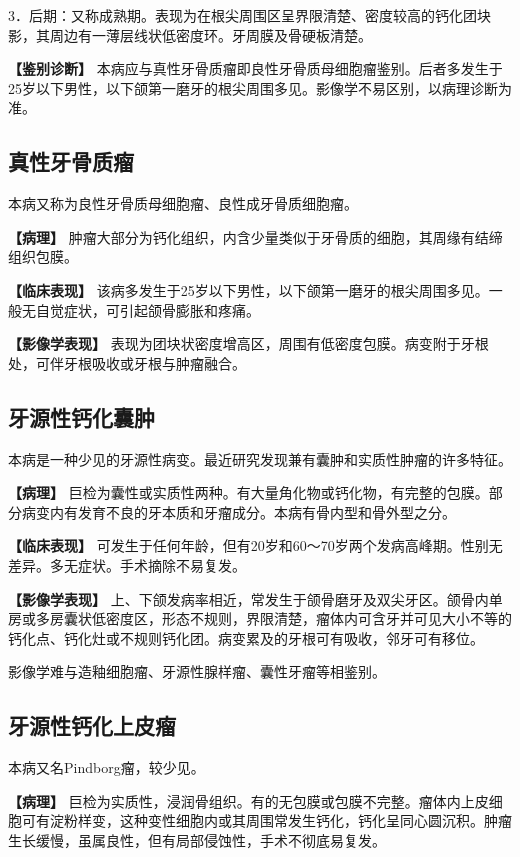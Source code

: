 3．后期：又称成熟期。表现为在根尖周围区呈界限清楚、密度较高的钙化团块影，其周边有一薄层线状低密度环。牙周膜及骨硬板清楚。

\textbf{【鉴别诊断】}
本病应与真性牙骨质瘤即良性牙骨质母细胞瘤鉴别。后者多发生于25岁以下男性，以下颌第一磨牙的根尖周围多见。影像学不易区别，以病理诊断为准。

\subsection{真性牙骨质瘤}

本病又称为良性牙骨质母细胞瘤、良性成牙骨质细胞瘤。

\textbf{【病理】}
肿瘤大部分为钙化组织，内含少量类似于牙骨质的细胞，其周缘有结缔组织包膜。

\textbf{【临床表现】}
该病多发生于25岁以下男性，以下颌第一磨牙的根尖周围多见。一般无自觉症状，可引起颌骨膨胀和疼痛。

\textbf{【影像学表现】}
表现为团块状密度增高区，周围有低密度包膜。病变附于牙根处，可伴牙根吸收或牙根与肿瘤融合。

\subsection{牙源性钙化囊肿}

本病是一种少见的牙源性病变。最近研究发现兼有囊肿和实质性肿瘤的许多特征。

\textbf{【病理】}
巨检为囊性或实质性两种。有大量角化物或钙化物，有完整的包膜。部分病变内有发育不良的牙本质和牙瘤成分。本病有骨内型和骨外型之分。

\textbf{【临床表现】}
可发生于任何年龄，但有20岁和60～70岁两个发病高峰期。性别无差异。多无症状。手术摘除不易复发。

\textbf{【影像学表现】}
上、下颌发病率相近，常发生于颌骨磨牙及双尖牙区。颌骨内单房或多房囊状低密度区，形态不规则，界限清楚，瘤体内可含牙并可见大小不等的钙化点、钙化灶或不规则钙化团。病变累及的牙根可有吸收，邻牙可有移位。

影像学难与造釉细胞瘤、牙源性腺样瘤、囊性牙瘤等相鉴别。

\subsection{牙源性钙化上皮瘤}

本病又名Pindborg瘤，较少见。

\textbf{【病理】}
巨检为实质性，浸润骨组织。有的无包膜或包膜不完整。瘤体内上皮细胞可有淀粉样变，这种变性细胞内或其周围常发生钙化，钙化呈同心圆沉积。肿瘤生长缓慢，虽属良性，但有局部侵蚀性，手术不彻底易复发。

